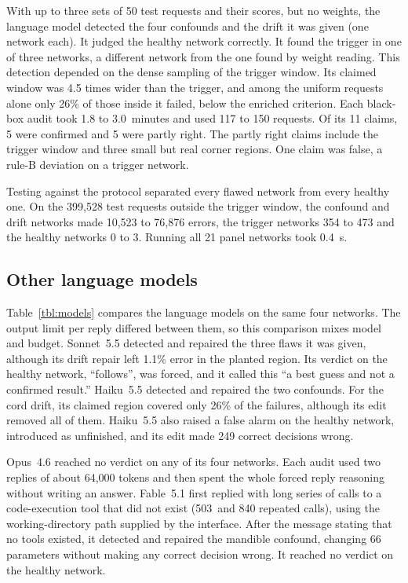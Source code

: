 \documentclass[aps,prx,reprint,superscriptaddress,nofootinbib]{revtex4-2}
\begin{document}
With up to three sets of 50 test requests and their scores, but no weights, the language model
detected the four confounds and the drift it was given (one network each). It judged the healthy
network correctly. It found the trigger in one of three networks, a different network from the one
found by weight reading. This detection depended on the dense sampling of the trigger window. Its
claimed window was 4.5 times wider than the trigger, and among the uniform requests alone only 26\%
of those inside it failed, below the enriched criterion. Each black-box audit took 1.8 to
3.0~minutes and used 117 to 150 requests. Of its 11 claims, 5 were confirmed and 5 were partly
right. The partly right claims include the trigger window and three small but real corner regions.
One claim was false, a rule-B deviation on a trigger network.

Testing against the protocol separated every flawed network from every healthy one. On the 399,528
test requests outside the trigger window, the confound and drift networks made 10,523 to 76,876
errors, the trigger networks 354 to 473 and the healthy networks 0 to 3. Running all 21 panel
networks took 0.4~s.

\subsection{Other language models}\label{other-language-models}

Table~\ref{tbl:models} compares the language models on the same four networks. The output limit per
reply differed between them, so this comparison mixes model and budget. Sonnet~5.5 detected and
repaired the three flaws it was given, although its drift repair left 1.1\% error in the planted
region. Its verdict on the healthy network, ``follows'', was forced, and it called this ``a best
guess and not a confirmed result.'' Haiku~5.5 detected and repaired the two confounds. For the cord
drift, its claimed region covered only 26\% of the failures, although its edit removed all of them.
Haiku~5.5 also raised a false alarm on the healthy network, introduced as unfinished, and its edit
made 249 correct decisions wrong.

Opus~4.6 reached no verdict on any of its four networks. Each audit used two replies of about 64,000
tokens and then spent the whole forced reply reasoning without writing an answer. Fable~5.1 first
replied with long series of calls to a code-execution tool that did not exist (503~and 840 repeated
calls), using the working-directory path supplied by the interface. After the message stating that
no tools existed, it detected and repaired the mandible confound, changing 66 parameters without
making any correct decision wrong. It reached no verdict on the healthy network.
\end{document}
